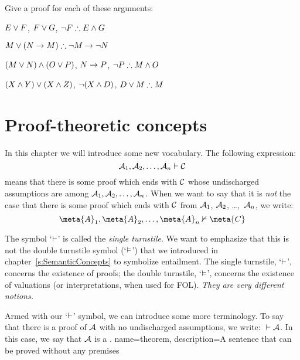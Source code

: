 \problempart 
Give a proof for each of these arguments:
\begin{earg}
\item $E\vee F$, $F\vee G$, $\enot F \therefore E \eand G$
\item $M\eor(N\eif M) \therefore \enot M \eif \enot N$
\item $(M \vee N) \wedge (O \vee P)$, $N \rightarrow P$, $\enot P \therefore M\eand O$
\item $(X\wedge Y)\vee(X\wedge Z)$, $\neg(X\wedge D)$, $D\eor M \therefore M$
\end{earg}



\chapter{Proof-theoretic concepts}\label{s:ProofTheoreticConcepts}

In this chapter we will introduce some new vocabulary. The following expression:
$$\mathcal{A}_1, \mathcal{A}_2, \ldots, \mathcal{A}_n \vdash \mathcal{C}$$
means that there is some proof which ends with $\mathcal{C}$ whose undischarged assumptions are among $\mathcal{A}_1, \mathcal{A}_2, \ldots, \mathcal{A}_n$. When we want to say that it is \emph{not} the case that there is some proof which ends with $\mathcal{C}$ from $\mathcal{A}_1$, $\mathcal{A}_2$, \dots,~$\mathcal{A}_n$, we write:  $$\meta{A}_1, \meta{A}_2, \ldots, \meta{A}_n \nproves \meta{C}$$ 

The symbol `$\vdash$' is called the \emph{single turnstile}. We want to emphasize that this is not the {double turnstile} symbol (`$\vDash$') that we introduced in chapter~\ref{s:SemanticConcepts} to symbolize entailment. The single turnstile, `$\vdash$', concerns the existence of proofs; the double turnstile, `$\vDash$', concerns the existence of valuations (or interpretations, when used for FOL). \emph{They are very different notions.}

Armed with our `$\vdash$' symbol, we can introduce some more terminology. To say that there is a proof of $\mathcal{A}$ with no undischarged assumptions, we write: ${} \vdash \mathcal{A}$. In this case, we say that $\mathcal{A}$ is a .
{
name=theorem,
description={A sentence that can be proved without any premises}
}

